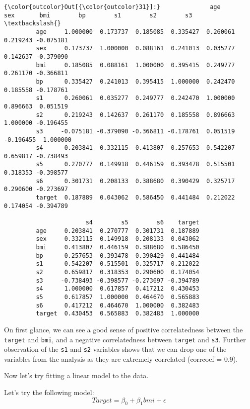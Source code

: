 \documentclass[11pt]{article}
\begin{document}
\begin{Verbatim}[commandchars=\\\{\}]
{\color{outcolor}Out[{\color{outcolor}31}]:}              age       sex       bmi        bp        s1        s2        s3  \textbackslash{}
         age     1.000000  0.173737  0.185085  0.335427  0.260061  0.219243 -0.075181   
         sex     0.173737  1.000000  0.088161  0.241013  0.035277  0.142637 -0.379090   
         bmi     0.185085  0.088161  1.000000  0.395415  0.249777  0.261170 -0.366811   
         bp      0.335427  0.241013  0.395415  1.000000  0.242470  0.185558 -0.178761   
         s1      0.260061  0.035277  0.249777  0.242470  1.000000  0.896663  0.051519   
         s2      0.219243  0.142637  0.261170  0.185558  0.896663  1.000000 -0.196455   
         s3     -0.075181 -0.379090 -0.366811 -0.178761  0.051519 -0.196455  1.000000   
         s4      0.203841  0.332115  0.413807  0.257653  0.542207  0.659817 -0.738493   
         s5      0.270777  0.149918  0.446159  0.393478  0.515501  0.318353 -0.398577   
         s6      0.301731  0.208133  0.388680  0.390429  0.325717  0.290600 -0.273697   
         target  0.187889  0.043062  0.586450  0.441484  0.212022  0.174054 -0.394789   
         
                       s4        s5        s6    target  
         age     0.203841  0.270777  0.301731  0.187889  
         sex     0.332115  0.149918  0.208133  0.043062  
         bmi     0.413807  0.446159  0.388680  0.586450  
         bp      0.257653  0.393478  0.390429  0.441484  
         s1      0.542207  0.515501  0.325717  0.212022  
         s2      0.659817  0.318353  0.290600  0.174054  
         s3     -0.738493 -0.398577 -0.273697 -0.394789  
         s4      1.000000  0.617857  0.417212  0.430453  
         s5      0.617857  1.000000  0.464670  0.565883  
         s6      0.417212  0.464670  1.000000  0.382483  
         target  0.430453  0.565883  0.382483  1.000000  
\end{Verbatim}
            
    On first glance, we can see a good sense of positive correlatedness
between the \texttt{target} and \texttt{bmi}, and a negative
correlatedness between \texttt{target} and \texttt{s3}. Further
observation of the \texttt{s1} and \texttt{s2} variables shows that we
can drop one of the variables from the analysis as they are extremely
correlated (corrcoef = \(0.9\)).

    Now let's try fitting a linear model to the data.

    Let's try the following model:
\[ Target = \beta_{0} + \beta_{1} bmi + \epsilon \]
\end{document}
